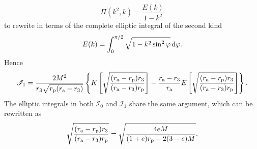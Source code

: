 \begin{equation}
\Pi(k^2,k) = \dfrac{E(k)}{1 - k^2}
\end{equation}
to rewrite in terms of the complete elliptic integral of the second kind \citep[19.2.5, 19.2.8]{Olver2010}
\begin{equation}
E(k) = \int_{0}^{\pi/2}{\sqrt{1 - k^2 \sin^2\varphi}}\,\mathrm{d}{\varphi}.
\end{equation}
Hence
\begin{equation}
\mathscr{I}_1 = \dfrac{2M^2}{r_3\sqrt{r_\mathrm{p}(r_\mathrm{a} - r_3)}}\left\{K\left[\sqrt{\dfrac{(r_\mathrm{a} - r_\mathrm{p})r_3}{(r_\mathrm{a} - r_3)r_\mathrm{p}}}\right] - \dfrac{r_\mathrm{a} - r_3}{r_\mathrm{a}}E\left[\sqrt{\dfrac{(r_\mathrm{a} - r_\mathrm{p})r_3}{(r_\mathrm{a} - r_3)r_\mathrm{p}}}\right]\right\}.
\end{equation}
The elliptic integrals in both $\mathscr{I}_0$ and $\mathscr{I}_1$ share the same argument, which can be rewritten as
\begin{equation}
\sqrt{\dfrac{(r_\mathrm{a} - r_\mathrm{p})r_3}{(r_\mathrm{a} - r_3)r_\mathrm{p}}} = \sqrt{\dfrac{4 e M}{(1+e) r_\mathrm{p} - 2(3 - e)M}}.
\end{equation}

